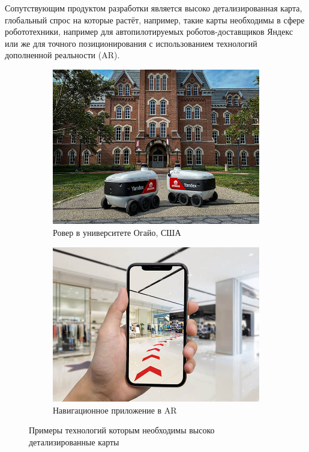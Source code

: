     Сопутствующим продуктом разработки является высоко детализированная карта, глобальный спрос на которые растёт, например, такие карты необходимы в сфере робототехники, например для автопилотируемых роботов-доставщиков Яндекс или же для точного позиционирования с использованием технологий дополненной реальности (AR).
    \begin{figure}[H]
      \centering
      \begin{subfigure}[b]{0.45\textwidth}
        \centering
        \includegraphics[width=\textwidth]{assets/img/rover.jpg}
        \caption{Ровер в университете Огайо, США}
      \end{subfigure}
      \hfill
      \begin{subfigure}[b]{.45\textwidth}
        \centering
        \includegraphics[width=\textwidth]{assets/img/AR.jpg}
        \caption{Навигационное приложение в AR}
      \end{subfigure}
      \caption{Примеры технологий которым необходимы высоко детализированные карты}
    \end{figure}

